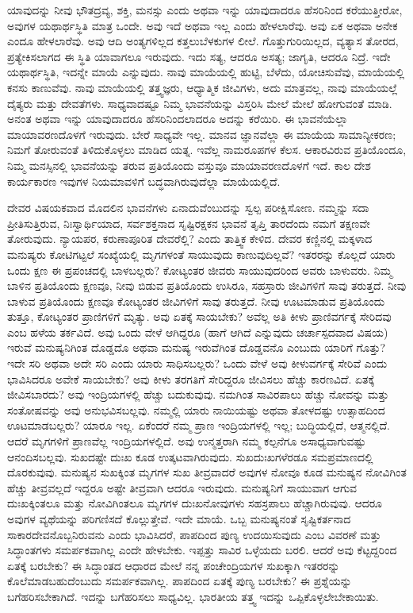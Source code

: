\vskip 0.2cm

ಯಾವುದನ್ನು ನೀವು ಭೌತದ್ರವ್ಯ, ಶಕ್ತಿ, ಮನಸ್ಸು ಎಂದು ಅಥವಾ ಇನ್ನು ಯಾವುದಾದರೂ ಹೆಸರಿನಿಂದ ಕರೆಯುತ್ತೀರೋ, ಅವುಗಳ ಯಥಾರ್ಥಸ್ಥಿತಿ ಮಾತ್ರ ಒಂದೇ. ಅವು ಇದೆ ಅಥವಾ ಇಲ್ಲ ಎಂದು ಹೇಳಲಾರೆವು. ಅವು ಏಕ ಅಥವಾ ಅನೇಕ ಎಂದೂ ಹೇಳಲಾರೆವು. ಅವು ಆದಿ ಅಂತ್ಯಗಳಿಲ್ಲದ ಕತ್ತಲುಬೆಳಕುಗಳ ಲೀಲೆ. ಗೊತ್ತುಗುರಿಯಿಲ್ಲದ, ವ್ಯತ್ಯಾಸ ತೋರದ, ಪ್ರತ್ಯೇಕಿಸಲಾಗದ ಈ ಸ್ಥಿತಿ ಯಾವಾಗಲೂ ಇರುವುದು. ಇದು ಸತ್ಯ, ಆದರೂ ಅಸತ್ಯ; ಜಾಗೃತಿ, ಆದರೂ ನಿದ್ರೆ. ಇದೇ ಯಥಾರ್ಥಸ್ಥಿತಿ, ಇದನ್ನೇ ಮಾಯೆ ಎನ್ನುವುದು. ನಾವು ಮಾಯೆಯಲ್ಲಿ ಹುಟ್ಟಿ, ಬೆಳೆದು, ಯೋಚಿಸುವೆವು, ಮಾಯೆಯಲ್ಲಿ ಕನಸು ಕಾಣುವೆವು. ನಾವು ಮಾಯೆಯಲ್ಲಿ ತತ್ತ್ವಜ್ಞರು, ಆಧ್ಯಾತ್ಮಿಕ ಜೀವಿಗಳು, ಅದು ಮಾತ್ರವಲ್ಲ, ನಾವು ಮಾಯೆಯಲ್ಲೆ ದೈತ್ಯರು ಮತ್ತು ದೇವತೆಗಳು. ಸಾಧ್ಯವಾದಷ್ಟೂ ನಿಮ್ಮ ಭಾವನೆಯನ್ನು ವಿಸ್ತರಿಸಿ ಮೇಲೆ ಮೇಲೆ ಹೋಗುವಂತೆ ಮಾಡಿ. ಅನಂತ ಅಥವಾ ಇನ್ನು ಯಾವುದಾದರೂ ಹೆಸರಿನಿಂದಲಾದರೂ ಅದನ್ನು ಕರೆಯಿರಿ. ಈ ಭಾವನೆಯೆಲ್ಲಾ ಮಾಯಾವರಣದೊಳಗೆ ಇರುವುದು. ಬೇರೆ ಸಾಧ್ಯವೇ ಇಲ್ಲ. ಮಾನವ ಜ್ಞಾನವೆಲ್ಲಾ ಈ ಮಾಯೆಯ ಸಾಮಾನ್ಯೀಕರಣ; ನಿಮಗೆ ತೋರುವಂತೆ ತಿಳಿದುಕೊಳ್ಳಲು ಮಾಡಿದ ಯತ್ನ. ಇವೆಲ್ಲ ನಾಮರೂಪಗಳ ಕೆಲಸ. ಆಕಾರವಿರುವ ಪ್ರತಿಯೊಂದೂ, ನಿಮ್ಮ ಮನಸ್ಸಿನಲ್ಲಿ ಭಾವನೆಯನ್ನು ತರುವ ಪ್ರತಿಯೊಂದು ವಸ್ತುವೂ ಮಾಯಾವರಣದೊಳಗೆ ಇದೆ. ಕಾಲ ದೇಶ ಕಾರ್ಯಕಾರಣ ಇವುಗಳ ನಿಯಮಾವಳಿಗೆ ಬದ್ಧವಾಗಿರುವುದೆಲ್ಲಾ ಮಾಯೆಯಲ್ಲಿದೆ.

\vskip 0.2cm

ದೇವರ ವಿಷಯಕವಾದ ಮೊದಲಿನ ಭಾವನೆಗಳು ಏನಾದುವೆಂಬುದನ್ನು ಸ್ವಲ್ಪ ಪರೀಕ್ಷಿಸೋಣ. ನಮ್ಮನ್ನು ಸದಾ ಪ್ರೀತಿಸುತ್ತಿರುವ, ನಿಃಸ್ವಾರ್ಥಿಯಾದ, ಸರ್ವಶಕ್ತನಾದ ಸೃಷ್ಟಿರಕ್ಷಕನ ಭಾವನೆ ತೃಪ್ತಿ ತಾರದೆಂದು ನಮಗೆ ತಕ್ಷಣವೇ ತೋರುವುದು. ನ್ಯಾಯಪರ, ಕರುಣಾಪೂರಿತ ದೇವರೆಲ್ಲಿ? ಎಂದು ತಾತ್ತ್ವಿಕ ಕೇಳಿದ. ದೇವರ ಕಣ್ಣಿನಲ್ಲಿ ಮಕ್ಕಳಾದ ಮನುಷ್ಯರು ಕೋಟಿಗಟ್ಟಲೆ ಸಂಖ್ಯೆಯಲ್ಲಿ ಮೃಗಗಳಂತೆ ಸಾಯುವುದು ಕಾಣುವುದಿಲ್ಲವೆ? ಇತರರನ್ನು ಕೊಲ್ಲದೆ ಯಾರು ಒಂದು ಕ್ಷಣ ಈ ಪ್ರಪಂಚದಲ್ಲಿ ಬಾಳಬಲ್ಲರು? ಕೋಟ್ಯಂತರ ಜೀವರು ಸಾಯುವುದರಿಂದ ಅವರು ಬಾಳುವರು. ನಿಮ್ಮ ಬಾಳಿನ ಪ್ರತಿಯೊಂದು ಕ್ಷಣವೂ, ನೀವು ಬಿಡುವ ಪ್ರತಿಯೊಂದು ಉಸಿರೂ, ಸಹಸ್ರಾರು ಜೀವಿಗಳಿಗೆ ಸಾವು ತರುತ್ತದೆ. ನೀವು ಬಾಳುವ ಪ್ರತಿಯೊಂದು ಕ್ಷಣವೂ ಕೋಟ್ಯಂತರ ಜೀವಿಗಳಿಗೆ ಸಾವು ತರುತ್ತದೆ. ನೀವು ಊಟಮಾಡುವ ಪ್ರತಿಯೊಂದು ತುತ್ತೂ, ಕೋಟ್ಯಂತರ ಪ್ರಾಣಿಗಳಿಗೆ ಮೃತ್ಯು. ಅವು ಏತಕ್ಕೆ ಸಾಯಬೇಕು? ಅವೆಲ್ಲ ಅತಿ ಕೀಳು ಪ್ರಾಣಿವರ್ಗಕ್ಕೆ ಸೇರಿದವು ಎಂಬ ಹಳೆಯ ತರ್ಕವಿದೆ. ಅವು ಒಂದು ವೇಳೆ ಆಗಿದ್ದರೂ (ಹಾಗೆ ಆಗಿದೆ ಎನ್ನುವುದು ಚರ್ಚಾಸ್ಪದವಾದ ವಿಷಯ) ಇರುವೆ ಮನುಷ್ಯನಿಗಿಂತ ದೊಡ್ಡದೊ ಅಥವಾ ಮನುಷ್ಯ ಇರುವೆಗಿಂತ ದೊಡ್ಡವನೊ ಎಂಬುದು ಯಾರಿಗೆ ಗೊತ್ತು? ಇದೇ ಸರಿ ಅಥವಾ ಅದೇ ಸರಿ ಎಂದು ಯಾರು ಸಾಧಿಸಬಲ್ಲರು? ಒಂದು ವೇಳೆ ಅವು ಕೀಳುವರ್ಗಕ್ಕೆ ಸೇರಿವೆ ಎಂದು ಭಾವಿಸಿದರೂ ಅವೇಕೆ ಸಾಯಬೇಕು? ಅವು ಕೀಳು ತರಗತಿಗೆ ಸೇರಿದ್ದರೂ ಜೀವಿಸಲು ಹೆಚ್ಚು ಕಾರಣವಿದೆ. ಏತಕ್ಕೆ ಜೀವಿಸಬಾರದು? ಅವು ಇಂದ್ರಿಯಗಳಲ್ಲಿ ಹೆಚ್ಚು ಬದುಕುವುವು. ನಮಗಿಂತ ಸಾವಿರಪಾಲು ಹೆಚ್ಚು ನೋವನ್ನು ಮತ್ತು ಸಂತೋಷವನ್ನು ಅವು ಅನುಭವಿಸಬಲ್ಲವು. ನಮ್ಮಲ್ಲಿ ಯಾರು ನಾಯಿಯಷ್ಟು ಅಥವಾ ತೋಳದಷ್ಟು ಉತ್ಸಾಹದಿಂದ ಊಟಮಾಡಬಲ್ಲರು? ಯಾರೂ ಇಲ್ಲ. ಏಕೆಂದರೆ ನಮ್ಮ ಪ್ರಾಣ ಇಂದ್ರಿಯಗಳಲ್ಲಿ ಇಲ್ಲ; ಬುದ್ಧಿಯಲ್ಲಿದೆ, ಆತ್ಮನಲ್ಲಿದೆ. ಆದರೆ ಮೃಗಗಳಿಗೆ ಪ್ರಾಣವೆಲ್ಲ ಇಂದ್ರಿಯಗಳಲ್ಲಿದೆ. ಅವು ಉನ್ಮತ್ತರಾಗಿ ನಮ್ಮ ಕಲ್ಪನೆಗೂ ಅಸಾಧ್ಯವಾಗುವಷ್ಟು ಆನಂದಿಸಬಲ್ಲವು. ಸುಖದಷ್ಟೇ ದುಃಖ ಕೂಡ ಉತ್ಕಟವಾಗಿರುವುದು. ಸುಖದುಃಖಗಳೆರಡೂ ಸಮಪ್ರಮಾಣದಲ್ಲಿ ದೊರಕುವುವು. ಮನುಷ್ಯನ ಸುಖಕ್ಕಿಂತ ಮೃಗಗಳ ಸುಖ ತೀವ್ರವಾದರೆ ಅವುಗಳ ನೋವೂ ಕೂಡ ಮನುಷ್ಯನ ನೋವಿಗಿಂತ ಹೆಚ್ಚು ತೀವ್ರವಲ್ಲದೆ ಇದ್ದರೂ ಅಷ್ಟೇ ತೀವ್ರವಾಗಿ ಆದರೂ ಇರುವುದು. ಮನುಷ್ಯನಿಗೆ ಸಾಯುವಾಗ ಆಗುವ ದುಃಖಕ್ಕಿಂತಲೂ ಮತ್ತು ನೋವಿಗಿಂತಲೂ ಮೃಗಗಳ ದುಃಖನೋವುಗಳು ಸಹಸ್ರಪಾಲು ಹೆಚ್ಚಾಗಿರುವುವು. ಆದರೂ ಅವುಗಳ ವ್ಯಥೆಯನ್ನು ಪರಿಗಣಿಸದೆ ಕೊಲ್ಲುತ್ತೇವೆ. ಇದೇ ಮಾಯೆ. ಒಬ್ಬ ಮನುಷ್ಯನಂತೆ ಸೃಷ್ಟಿಕರ್ತನಾದ ಸಾಕಾರದೇವನೊಬ್ಬನಿರುವನು ಎಂದು ಭಾವಿಸಿದರೆ, ಪಾಪದಿಂದ ಪುಣ್ಯ ಉದಯಿಸುವುದು ಎಂಬ ವಿವರಣೆ ಮತ್ತು ಸಿದ್ಧಾಂತಗಳು ಸಮರ್ಪಕವಾಗಿಲ್ಲ ಎಂದೇ ಹೇಳಬೇಕು. ಇಪ್ಪತ್ತು ಸಾವಿರ ಒಳ್ಳೆಯದು ಬರಲಿ. ಆದರೆ ಅವು ಕೆಟ್ಟದ್ದರಿಂದ ಏತಕ್ಕೆ ಬರಬೇಕು? ಈ ಸಿದ್ಧಾಂತದ ಆಧಾರದ ಮೇಲೆ ನನ್ನ ಪಂಚೇಂದ್ರಿಯಗಳ ಸುಖಕ್ಕಾಗಿ ಇತರರನ್ನು ಕೊಲೆಮಾಡಬಹುದೆಂಬುದು ಸಮರ್ಪಕವಾಗಿಲ್ಲ. ಪಾಪದಿಂದ ಏತಕ್ಕೆ ಪುಣ್ಯ ಬರಬೇಕು? ಈ ಪ್ರಶ್ನೆಯನ್ನು ಬಗೆಹರಿಸಬೇಕಾಗಿದೆ. ಇದನ್ನು ಬಗೆಹರಿಸಲು ಸಾಧ್ಯವಿಲ್ಲ. ಭಾರತೀಯ ತತ್ತ್ವ ಇದನ್ನು ಒಪ್ಪಿಕೊಳ್ಳಲೇಬೇಕಾಯಿತು.

